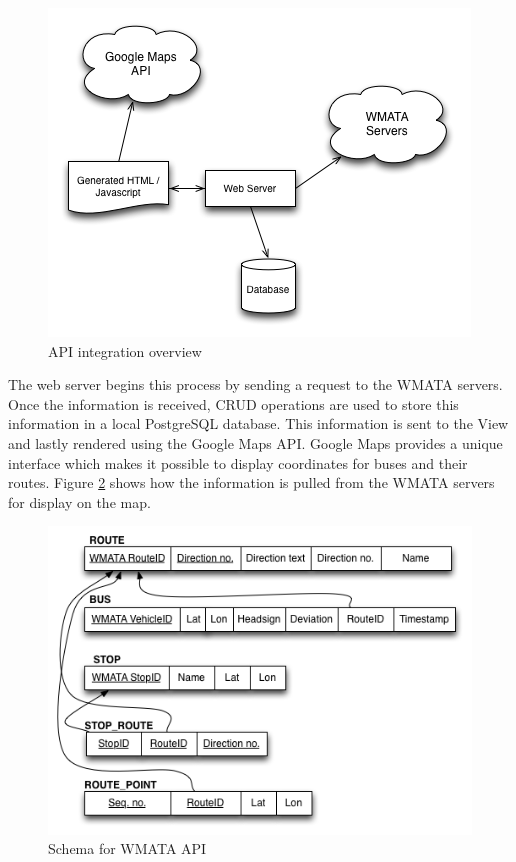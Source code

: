 \documentclass[12pt]{article}
\begin{document}
\begin{figure}[ht]
	\centerline{\includegraphics[scale=0.6]{design.png}}
	\caption{API integration overview}
	\label{fig:designOverview}
\end{figure}

The web server begins this process by sending a request to the WMATA servers.  Once the information is received, CRUD operations are used to store this information in a local PostgreSQL database.  This information is sent to the View and lastly rendered using the Google Maps API. Google Maps provides a unique interface which makes it possible to display coordinates for buses and their routes.  Figure \ref{fig:busSchema} shows how the information is pulled from the WMATA servers for display on the map.


\begin{figure}[ht]
	\centerline{\includegraphics[scale=0.6]{bus-schema.png}}
	\caption{Schema for WMATA API}
	\label{fig:busSchema}
\end{figure}
\end{document}
